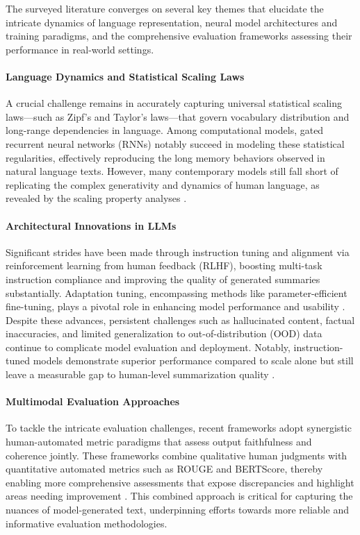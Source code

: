 \documentclass[sigconf]{acmart}
\begin{document}
The surveyed literature converges on several key themes that elucidate the intricate dynamics of language representation, neural model architectures and training paradigms, and the comprehensive evaluation frameworks assessing their performance in real-world settings.

\paragraph{Language Dynamics and Statistical Scaling Laws}  
A crucial challenge remains in accurately capturing universal statistical scaling laws—such as Zipf’s and Taylor’s laws—that govern vocabulary distribution and long-range dependencies in language. Among computational models, gated recurrent neural networks (RNNs) notably succeed in modeling these statistical regularities, effectively reproducing the long memory behaviors observed in natural language texts. However, many contemporary models still fall short of replicating the complex generativity and dynamics of human language, as revealed by the scaling property analyses \cite{ref51}.

\paragraph{Architectural Innovations in LLMs}  
Significant strides have been made through instruction tuning and alignment via reinforcement learning from human feedback (RLHF), boosting multi-task instruction compliance and improving the quality of generated summaries substantially. Adaptation tuning, encompassing methods like parameter-efficient fine-tuning, plays a pivotal role in enhancing model performance and usability \cite{ref10,ref52}. Despite these advances, persistent challenges such as hallucinated content, factual inaccuracies, and limited generalization to out-of-distribution (OOD) data continue to complicate model evaluation and deployment. Notably, instruction-tuned models demonstrate superior performance compared to scale alone but still leave a measurable gap to human-level summarization quality \cite{ref1}.

\paragraph{Multimodal Evaluation Approaches}  
To tackle the intricate evaluation challenges, recent frameworks adopt synergistic human-automated metric paradigms that assess output faithfulness and coherence jointly. These frameworks combine qualitative human judgments with quantitative automated metrics such as ROUGE and BERTScore, thereby enabling more comprehensive assessments that expose discrepancies and highlight areas needing improvement \cite{ref10,ref51}. This combined approach is critical for capturing the nuances of model-generated text, underpinning efforts towards more reliable and informative evaluation methodologies.
\end{document}
